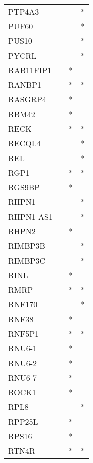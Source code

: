 \begin{longtable}{lccc}
PTP4A3       &           &     &       * \\
PUF60        &           &     &       * \\
PUS10        &           &     &       * \\
PYCRL        &           &     &       * \\
RAB11FIP1    &           &   * &         \\
RANBP1       &           &   * &       * \\
RASGRP4      &           &   * &         \\
RBM42        &           &   * &         \\
RECK         &           &   * &       * \\
RECQL4       &           &     &       * \\
REL          &           &     &       * \\
RGP1         &           &   * &       * \\
RGS9BP       &           &   * &         \\
RHPN1        &           &     &       * \\
RHPN1-AS1    &           &     &       * \\
RHPN2        &           &   * &         \\
RIMBP3B      &           &     &       * \\
RIMBP3C      &           &     &       * \\
RINL         &           &   * &         \\
RMRP         &           &   * &       * \\
RNF170       &           &     &       * \\
RNF38        &           &   * &         \\
RNF5P1       &           &   * &       * \\
RNU6-1       &           &   * &         \\
RNU6-2       &           &   * &         \\
RNU6-7       &           &   * &         \\
ROCK1        &           &   * &         \\
RPL8         &           &     &       * \\
RPP25L       &           &   * &         \\
RPS16        &           &   * &         \\
RTN4R        &           &   * &       * \\

\end{longtable}
